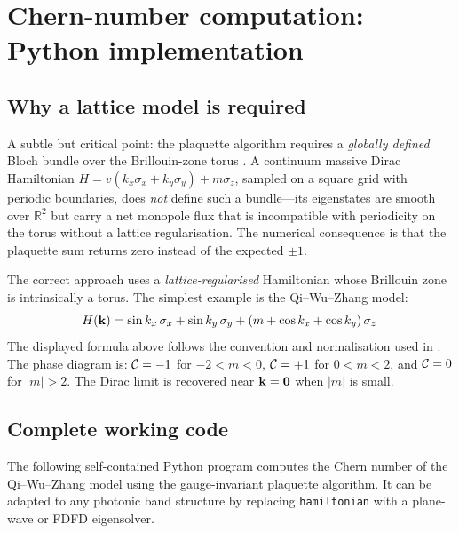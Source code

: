 \section{Chern-number computation: Python implementation}
\label{sec:appC-python}

\subsection{Why a lattice model is required}
\label{sec:appC-lattice-why}

A subtle but critical point: the plaquette algorithm requires a
\emph{globally defined} Bloch bundle over the Brillouin-zone torus
\cite{ozawa2018topological}.
A continuum massive Dirac Hamiltonian $H=v(k_x\sigma_x+k_y\sigma_y)
+m\sigma_z$, sampled on a square grid with periodic boundaries, does
\emph{not} define such a bundle---its eigenstates are smooth over
$\mathbb{R}^2$ but carry a net monopole flux that is incompatible with
periodicity on the torus without a lattice regularisation.  The
numerical consequence is that the plaquette sum returns zero instead of
the expected $\pm 1$.

The correct approach uses a \emph{lattice-regularised} Hamiltonian
whose Brillouin zone is intrinsically a torus.  The simplest example
is the Qi--Wu--Zhang model:
\begin{equation}\label{eq:appC-qwz}
  H(\mathbf{k})=\sin k_x\,\sigma_x+\sin k_y\,\sigma_y
  +(m+\cos k_x+\cos k_y)\,\sigma_z\,
\end{equation}
The displayed formula above follows the convention and normalisation used in \cite{raghu2008analogs}.
The phase diagram is: $\mathcal{C}=-1$ for $-2<m<0$, $\mathcal{C}=+1$ for
$0<m<2$, and $\mathcal{C}=0$ for $|m|>2$.  The Dirac limit is recovered
near $\mathbf{k}=\mathbf{0}$ when $|m|$ is small.

\subsection{Complete working code}
\label{sec:appC-code}

The following self-contained Python program computes the Chern number
of the Qi--Wu--Zhang model using the gauge-invariant plaquette
algorithm.  It can be adapted to any photonic band structure by
replacing \verb|hamiltonian| with a plane-wave or FDFD eigensolver.

